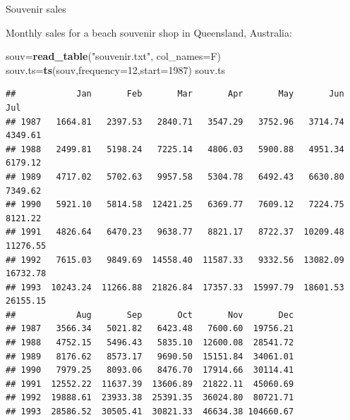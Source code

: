 \documentclass[
  ignorenonframetext,
]{beamer}
\newenvironment{Shaded}{\begin{snugshade}}{\end{snugshade}}
\newcommand{\DataTypeTok}[1]{\textcolor[rgb]{0.13,0.29,0.53}{#1}}
\newcommand{\DecValTok}[1]{\textcolor[rgb]{0.00,0.00,0.81}{#1}}
\newcommand{\KeywordTok}[1]{\textcolor[rgb]{0.13,0.29,0.53}{\textbf{#1}}}
\newcommand{\NormalTok}[1]{#1}
\newcommand{\StringTok}[1]{\textcolor[rgb]{0.31,0.60,0.02}{#1}}
\begin{document}
\begin{frame}[fragile]{Souvenir sales}
\protect\hypertarget{souvenir-sales}{}

Monthly sales for a beach souvenir shop in Queensland, Australia:

\scriptsize

\begin{Shaded}
\begin{Highlighting}[]
\NormalTok{souv=}\KeywordTok{read_table}\NormalTok{(}\StringTok{"souvenir.txt"}\NormalTok{, }\DataTypeTok{col_names=}\NormalTok{F)}
\NormalTok{souv.ts=}\KeywordTok{ts}\NormalTok{(souv,}\DataTypeTok{frequency=}\DecValTok{12}\NormalTok{,}\DataTypeTok{start=}\DecValTok{1987}\NormalTok{)}
\NormalTok{souv.ts}
\end{Highlighting}
\end{Shaded}

\begin{verbatim}
##            Jan       Feb       Mar       Apr       May       Jun       Jul
## 1987   1664.81   2397.53   2840.71   3547.29   3752.96   3714.74   4349.61
## 1988   2499.81   5198.24   7225.14   4806.03   5900.88   4951.34   6179.12
## 1989   4717.02   5702.63   9957.58   5304.78   6492.43   6630.80   7349.62
## 1990   5921.10   5814.58  12421.25   6369.77   7609.12   7224.75   8121.22
## 1991   4826.64   6470.23   9638.77   8821.17   8722.37  10209.48  11276.55
## 1992   7615.03   9849.69  14558.40  11587.33   9332.56  13082.09  16732.78
## 1993  10243.24  11266.88  21826.84  17357.33  15997.79  18601.53  26155.15
##            Aug       Sep       Oct       Nov       Dec
## 1987   3566.34   5021.82   6423.48   7600.60  19756.21
## 1988   4752.15   5496.43   5835.10  12600.08  28541.72
## 1989   8176.62   8573.17   9690.50  15151.84  34061.01
## 1990   7979.25   8093.06   8476.70  17914.66  30114.41
## 1991  12552.22  11637.39  13606.89  21822.11  45060.69
## 1992  19888.61  23933.38  25391.35  36024.80  80721.71
## 1993  28586.52  30505.41  30821.33  46634.38 104660.67
\end{verbatim}

\normalsize

\end{frame}
\end{document}
